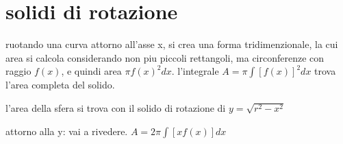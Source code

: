 \documentclass{article}
\begin{document}
\section{solidi di rotazione}

ruotando una curva attorno all'asse x, si crea una forma tridimenzionale, la cui area si calcola considerando non piu piccoli rettangoli, ma circonferenze con raggio $f(x)$, e quindi area  $\pi f(x)^2 dx$. l'integrale  $A = \pi \int [f(x)]^2 dx$ trova l'area completa del solido.

l'area della sfera si trova con il solido di rotazione di  $y=\sqrt{r^2-x^2}$ 

attorno alla y: vai a rivedere. $A =2 \pi \int [x f(x)] dx$
\end{document}
